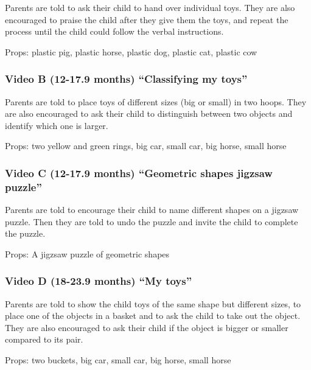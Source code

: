 \documentclass[man,floatsintext]{apa6}
\begin{document}
\begin{appendix}
Parents are told to ask their child to hand over individual toys. They
are also encouraged to praise the child after they give them the toys,
and repeat the process until the child could follow the verbal
instructions.

Props: plastic pig, plastic horse, plastic dog, plastic cat, plastic cow

\hypertarget{video-b-12-17.9-months-classifying-my-toys}{%
\subsubsection{Video B (12-17.9 months) ``Classifying my
toys''}\label{video-b-12-17.9-months-classifying-my-toys}}

Parents are told to place toys of different sizes (big or small) in two
hoops. They are also encouraged to ask their child to distinguish
between two objects and identify which one is larger.

Props: two yellow and green rings, big car, small car, big horse, small
horse

\hypertarget{video-c-12-17.9-months-geometric-shapes-jigzsaw-puzzle}{%
\subsubsection{Video C (12-17.9 months) ``Geometric shapes jigzsaw
puzzle''}\label{video-c-12-17.9-months-geometric-shapes-jigzsaw-puzzle}}

Parents are told to encourage their child to name different shapes on a
jigzsaw puzzle. Then they are told to undo the puzzle and invite the
child to complete the puzzle.

Props: A jigzsaw puzzle of geometric shapes

\hypertarget{video-d-18-23.9-months-my-toys}{%
\subsubsection{Video D (18-23.9 months) ``My
toys''}\label{video-d-18-23.9-months-my-toys}}

Parents are told to show the child toys of the same shape but different
sizes, to place one of the objects in a basket and to ask the child to
take out the object. They are also encouraged to ask their child if the
object is bigger or smaller compared to its pair.

Props: two buckets, big car, small car, big horse, small horse

\hypertarget{video-e-18-23.9-months-the-orchestra}{%
}
\end{appendix}
\end{document}
